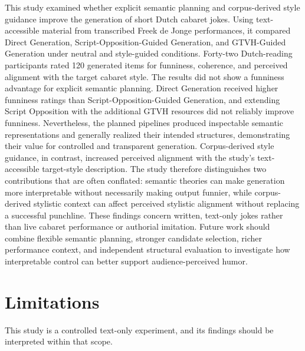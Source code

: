 \documentclass[11pt]{article}
\begin{document}
This study examined whether explicit semantic planning and corpus-derived style guidance improve the generation of short Dutch cabaret jokes. Using text-accessible material from transcribed Freek de Jonge performances, it compared Direct Generation, Script-Opposition-Guided Generation, and GTVH-Guided Generation under neutral and style-guided conditions. Forty-two Dutch-reading participants rated 120 generated items for funniness, coherence, and perceived alignment with the target cabaret style. The results did not show a funniness advantage for explicit semantic planning. Direct Generation received higher funniness ratings than Script-Opposition-Guided Generation, and extending Script Opposition with the additional GTVH resources did not reliably improve funniness. Nevertheless, the planned pipelines produced inspectable semantic representations and generally realized their intended structures, demonstrating their value for controlled and transparent generation. Corpus-derived style guidance, in contrast, increased perceived alignment with the study's text-accessible target-style description. The study therefore distinguishes two contributions that are often conflated: semantic theories can make generation more interpretable without necessarily making output funnier, while corpus-derived stylistic context can affect perceived stylistic alignment without replacing a successful punchline. These findings concern written, text-only jokes rather than live cabaret performance or authorial imitation. Future work should combine flexible semantic planning, stronger candidate selection, richer performance context, and independent structural evaluation to investigate how interpretable control can better support audience-perceived humor.

\section{Limitations}\label{limitations}

This study is a controlled text-only experiment, and its findings should be interpreted within that scope.
\end{document}
